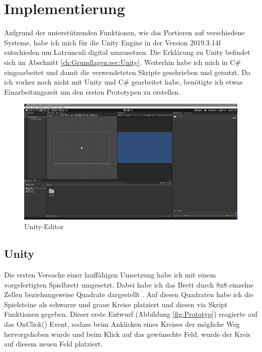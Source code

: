 
\chapter{Implementierung}
\label{ch:Implementierung}

Aufgrund der unterstützenden Funktionen, wie das Portieren auf verschiedene Systeme, habe ich mich für die Unity Engine in der Version 2019.3.14f entschieden um Latrunculi digital umzusetzen. Die Erklärung zu Unity befindet sich im Abschnitt \ref{ch:Grundlagen:sec:Unity}. Weiterhin habe ich mich in C\# eingearbeitet und damit die verwendeteten Skripte geschrieben und genutzt. Da ich vorher noch nicht mit Unity und C\# gearbeitet habe, benötigte ich etwas Einarbeitungszeit um den ersten Prototypen zu erstellen.

\begin{figure}[h]
	\centering
	\includegraphics{img/Unity-Editor}
	\caption{Unity-Editor}
	\label{fig:Editor}
\end{figure}

\section{Unity}
\label{ch:Implementierung:sec:Unity}

Die ersten Versuche einer lauffähigen Umsetzung habe ich mit einem vorgefertigten Spielbrett umgesetzt. Dabei habe ich das Brett durch 8x8 einzelne Zellen beziehungsweise Quadrate dargestellt%
. Auf diesen Quadraten habe ich die Spielsteine als schwarze und graue Kreise platziert und diesen via Skript Funktionen gegeben. Dieser erste Entwurf (Abbildung \ref{fig:Prototyp}) reagierte auf das OnClick() Event, sodass beim Anklicken eines Kreises der mögliche Weg hervorgehoben wurde und beim Klick auf das gewünschte Feld, wurde der Kreis auf diesem neuen Feld platziert.

